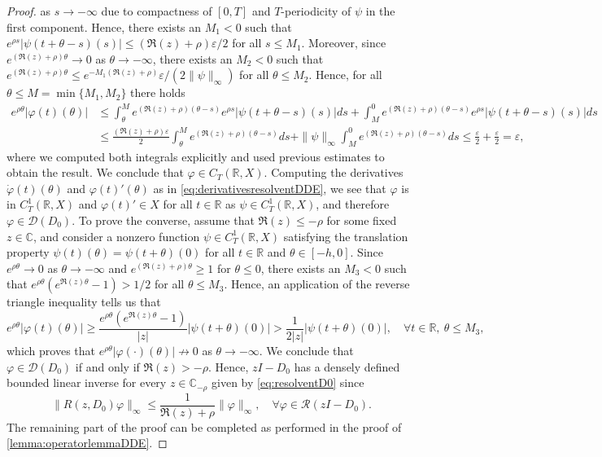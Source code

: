 \documentclass[english]{myarticle}
\begin{document}
\begin{sloppypar}
\begin{proof}
as $s \to - \infty$ due to compactness of $[0,T]$ and $T$-periodicity of $\psi$ in the first component. Hence, there exists an $M_1 < 0$ such that $e^{\rho s}|\psi(t+\theta-s)(s)| \leq (\Re(z) + \rho)\varepsilon /2$ for all $s \leq M_1$. Moreover, since $e^{(\Re(z) + \rho)\theta} \to 0$ as $\theta \to - \infty$, there exists an $M_2 < 0$ such that $e^{(\Re(z) + \rho)\theta} \leq e^{-M_1(\Re(z) + \rho)} \varepsilon/(2 \|\psi\|_\infty) $ for all $\theta \leq M_2$. Hence, for all $\theta \leq M = \min\{M_1,M_2\}$ there holds
\begin{align*}
    e^{\rho \theta} |\varphi(t)(\theta)| &\leq \int_\theta^M e^{(\Re(z) + \rho)(\theta-s)} e^{\rho s} |\psi(t+\theta-s)(s)| ds + \int_M^0 e^{(\Re(z) + \rho)(\theta-s)} e^{\rho s} |\psi(t+\theta-s)(s)| ds \\
    &\leq \frac{(\Re(z) + \rho) \varepsilon}{2} \int_\theta^M e^{(\Re(z) + \rho)(\theta-s)} ds + \| \psi \|_\infty \int_M^0 e^{(\Re(z) + \rho)(\theta-s)} ds \leq \frac{\varepsilon}{2} + \frac{\varepsilon}{2} = \varepsilon,
\end{align*}
where we computed both integrals explicitly and used previous estimates to obtain the result. We conclude that $\varphi \in C_T(\mathbb{R},X)$. Computing the derivatives $\dot{\varphi}(t)(\theta)$ and ${\varphi}(t)'(\theta)$ as in \eqref{eq:derivativesresolventDDE}, we see that $\varphi$ is in $C_T^1(\mathbb{R},X)$ and $\varphi(t)' \in X$ for all $t \in \mathbb{R}$ as $\psi \in C_T^1(\mathbb{R},X)$, and therefore $\varphi \in \mathcal{D}(D_0)$. To prove the converse, assume that $\Re(z) \leq - \rho$ for some fixed $z \in \mathbb{C}$, and consider a nonzero function $\psi \in C_T^1(\mathbb{R},X)$ satisfying the translation property $\psi(t)(\theta) = \psi(t+\theta)(0)$ for all $t \in \mathbb{R}$ and $\theta \in [-h,0]$. Since $e^{\rho \theta} \to 0$ as $\theta \to -\infty$ and $e^{(\Re(z) + \rho) \theta} \geq 1$ for $\theta \leq 0$, there exists an $M_3 < 0$ such that $e^{\rho \theta}(e^{\Re(z) \theta} - 1) > 1/2$ for all $\theta \leq M_3$. Hence, an application of the reverse triangle inequality tells us that
\begin{equation*}
    e^{\rho \theta} |\varphi(t)(\theta)| \geq \frac{e^{\rho \theta}(e^{\Re(z) \theta} - 1)}{|z|}|\psi(t+\theta)(0)|  > \frac{1}{2|z|}|\psi(t+\theta)(0)|, \quad \forall t \in \mathbb{R}, \ \theta \leq M_3,
\end{equation*}
which proves that $e^{\rho \theta} |\varphi(\cdot)(\theta)| \nrightarrow 0$ as $\theta \to - \infty$. We conclude that $\varphi \in \mathcal{D}(D_0)$ if and only if $\Re(z) > - \rho$. Hence, $zI-D_0$ has a densely defined bounded linear inverse for every $z \in \mathbb{C}_{-\rho}$ given by \eqref{eq:resolventD0} since
\begin{equation*}
    \|R(z,D_0)\varphi\|_\infty \leq \frac{1}{\Re(z) + \rho} \| \varphi \|_\infty, \quad \forall \varphi \in \mathcal{R}(zI-D_0).
\end{equation*}
The remaining part of the proof can be completed as performed in the proof of \cref{lemma:operatorlemmaDDE}.
\end{proof}


\end{sloppypar}
\end{document}
